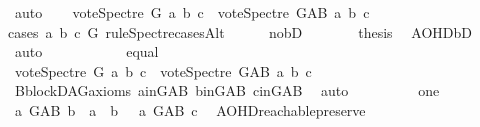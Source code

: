 \begin{isabellebody}
\ auto\isanewline
\ \ \isamarkupfalse%
\ {\isachardoublequoteopen}vote{\isacharunderscore}{\kern0pt}Spectre\ G\ a\ b\ c\ {\isasymle}\ vote{\isacharunderscore}{\kern0pt}Spectre\ G{\isacharunderscore}{\kern0pt}AB\ a\ b\ c{\isachardoublequoteclose}\isanewline
\ \ \isamarkupfalse%
{\isacharparenleft}{\kern0pt}cases\ a\ b\ c\ G\ rule{\isacharcolon}{\kern0pt}Spectre{\isacharunderscore}{\kern0pt}casesAlt{\isacharparenright}{\kern0pt}\isanewline
\ \ \ \ \isamarkupfalse%
\ no{\isacharunderscore}{\kern0pt}bD\isanewline
\ \ \ \ \isamarkupfalse%
\ \isamarkupfalse%
\ {\isacharquery}{\kern0pt}thesis\ \isamarkupfalse%
\ AOHD{\isachardot}{\kern0pt}bD\ {}{\isacharparenleft}{\kern0pt}{}{\isacharcomma}{\kern0pt}{}{\isacharcomma}{\kern0pt}{}{\isacharparenright}{\kern0pt}\ \isamarkupfalse%
\ auto\ \ \ \isanewline
\ \ \isamarkupfalse%
\isanewline
\ \ \ \ \isamarkupfalse%
\ equal\ \ \ \ \isanewline
\ \ \ \ \isamarkupfalse%
\ \isamarkupfalse%
\ {\isachardoublequoteopen}vote{\isacharunderscore}{\kern0pt}Spectre\ G\ a\ b\ c\ {\isasymle}\ vote{\isacharunderscore}{\kern0pt}Spectre\ G{\isacharunderscore}{\kern0pt}AB\ a\ b\ c{\isachardoublequoteclose}\isanewline
\ \ \ \ \ \ \isamarkupfalse%
\ B{}{\isachardot}{\kern0pt}blockDAG{\isacharunderscore}{\kern0pt}axioms\ a{\isacharunderscore}{\kern0pt}in{\isacharunderscore}{\kern0pt}G{\isacharunderscore}{\kern0pt}AB\ b{\isacharunderscore}{\kern0pt}in{\isacharunderscore}{\kern0pt}G{\isacharunderscore}{\kern0pt}AB\ c{\isacharunderscore}{\kern0pt}in{\isacharunderscore}{\kern0pt}G{\isacharunderscore}{\kern0pt}AB\ \isamarkupfalse%
\ auto\ \isanewline
\ \ \isamarkupfalse%
\isanewline
\ \ \ \ \isamarkupfalse%
\ one\isanewline
\ \ \ \ \isamarkupfalse%
\ \isamarkupfalse%
\ {\isachardoublequoteopen}{\isacharparenleft}{\kern0pt}a\ {\isasymrightarrow}\isactrlsup {\isacharplus}{\kern0pt}\isactrlbsub G{\isacharunderscore}{\kern0pt}AB\isactrlesub \ b\ {\isasymor}\ a\ {\isacharequal}{\kern0pt}\ b{\isacharparenright}{\kern0pt}\ {\isasymand}\ {\isacharparenleft}{\kern0pt}{\isasymnot}\ a\ {\isasymrightarrow}\isactrlsup {\isacharplus}{\kern0pt}\isactrlbsub G{\isacharunderscore}{\kern0pt}AB\isactrlesub \ c{\isacharparenright}{\kern0pt}{\isachardoublequoteclose}\ \isamarkupfalse%
\ AOHD{\isachardot}{\kern0pt}reachable{}{\isacharunderscore}{\kern0pt}preserve\isanewline

\end{isabellebody}
